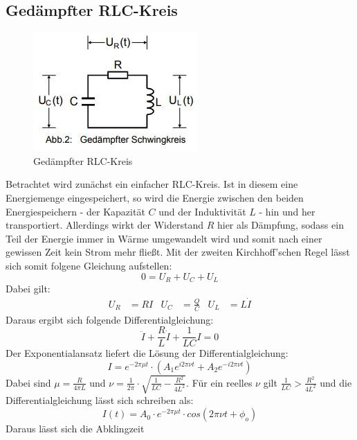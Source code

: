 \subsection{Gedämpfter RLC-Kreis}
\begin{figure}
  \centering
  \includegraphics{Text/Gedaempfter_RLC-Kreis.JPG}
  \caption{Gedämpfter RLC-Kreis \cite[284]{sample}}
  \label{fig:Aufbau1}
\end{figure}
Betrachtet wird zunächst ein einfacher RLC-Kreis. Ist in diesem eine Energiemenge eingespeichert, so wird die Energie zwischen
den beiden Energiespeichern - der Kapazität $C$ und der Induktivität $L$ - hin und her transportiert.
Allerdings wirkt der Widerstand $R$ hier als Dämpfung, sodass ein Teil der Energie immer in Wärme umgewandelt wird und somit
nach einer gewissen Zeit kein Strom mehr fließt.
Mit der zweiten Kirchhoff'schen Regel lässt sich somit folgene Gleichung aufstellen:
\begin{equation}
  0=U_R+U_C+U_L
\end{equation}
Dabei gilt:
\begin{align*}
  U_R&=RI & U_C&=\frac{Q}{C} & U_L&=L\dot{I}
\end{align*}
Daraus ergibt sich folgende Differentialgleichung:
\begin{equation}
  \ddot{I}+\frac{R}{L}\dot{I}+\frac{1}{LC}I=0
\end{equation}
Der Exponentialansatz liefert die Lösung der Differentialgleichung:
\begin{equation}
  I=e^{-2\pi \mu t}\cdot \left(A_1 e^{i2\pi \nu t}+A_2 e^{-i2\pi \nu t}\right)
  \label{eqn:lsg}
\end{equation}
Dabei sind $\mu=\frac{R}{4\pi L}$  und  $\nu = \frac{1}{2\pi}\cdot \sqrt{\frac{1}{LC} - \frac{R^2}{4L^2}}$.
Für ein reelles $\nu$ gilt $\frac {1}{LC} > \frac{R^2}{4L^2}$ und die Differentialgleichung lässt sich schreiben als:
\begin{equation}
  I(t) = A_0 \cdot e^{-2 \pi\mu t}\cdot cos{(2\pi\nu t+ \phi_o)}
\end{equation}
Daraus lässt sich die Abklingzeit
